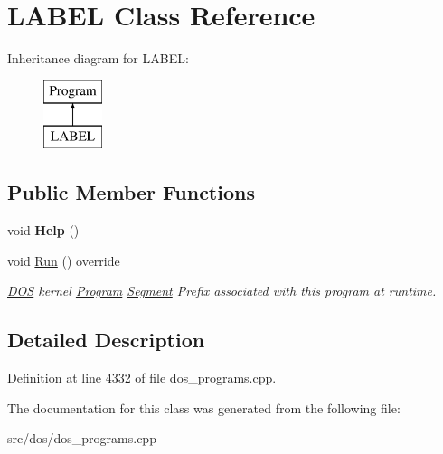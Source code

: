 \hypertarget{classLABEL}{\section{L\-A\-B\-E\-L Class Reference}
\label{classLABEL}
}
Inheritance diagram for L\-A\-B\-E\-L\-:\begin{figure}[H]
\begin{center}
\leavevmode
\includegraphics[height=2.000000cm]{classLABEL}
\end{center}
\end{figure}
\subsection*{Public Member Functions}
\begin{DoxyCompactItemize}
\item 
\hypertarget{classLABEL_ad6b2eb925e023fcbac597f6cf00d447f}{void {\bfseries Help} ()}\label{classLABEL_ad6b2eb925e023fcbac597f6cf00d447f}

\item 
\hypertarget{classLABEL_ac6fdf7e1b56f01f8e98cd7db4084f46c}{void \hyperlink{classLABEL_ac6fdf7e1b56f01f8e98cd7db4084f46c}{Run} () override}\label{classLABEL_ac6fdf7e1b56f01f8e98cd7db4084f46c}

\begin{DoxyCompactList}\small\item\em \hyperlink{classDOS}{D\-O\-S} kernel \hyperlink{classProgram}{Program} \hyperlink{structSegment}{Segment} Prefix associated with this program at runtime. \end{DoxyCompactList}\end{DoxyCompactItemize}


\subsection{Detailed Description}


Definition at line 4332 of file dos\-\_\-programs.\-cpp.



The documentation for this class was generated from the following file\-:\begin{DoxyCompactItemize}
\item 
src/dos/dos\-\_\-programs.\-cpp\end{DoxyCompactItemize}
